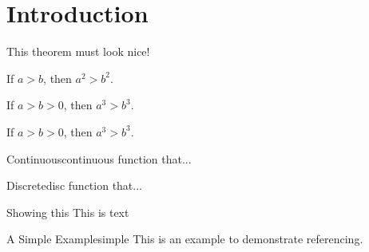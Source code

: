 \newpage
\chapter{Introduction}
\label{Introduction}

\begin{theorem}
	This theorem must look nice!
\end{theorem}
\begin{theorem}
If \(a > b\), then \(a^2 > b^2\).
\end{theorem}

\begin{corollary}
If \(a > b > 0\), then \(a^3 > b^3\).
\end{corollary}

\begin{proposition}
If \(a > b > 0\), then \(a^3 > b^3\).
\end{proposition}

\begin{definition}{Continuous}{continuous}
	{function that...}
\end{definition}

\begin{definition}{Discrete}{disc}
	{function that...}
\end{definition}


\begin{example}{Showing this}{}
	This is text
\end{example}


\begin{example}{A Simple Example}{simple}
This is an example to demonstrate referencing.
	\hfill
\end{example}
